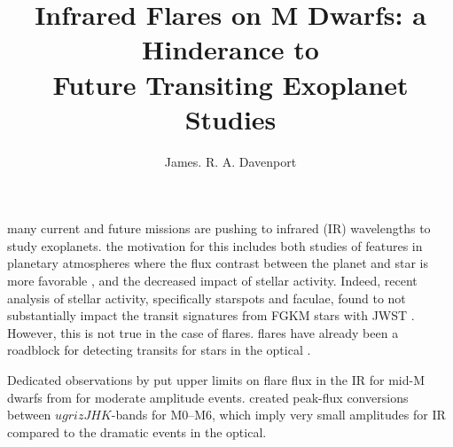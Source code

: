 \documentclass{rnaastex}
\begin{document}
\title{Infrared Flares on M Dwarfs: a Hinderance to\\ Future Transiting Exoplanet Studies}


\author{James. R. A. Davenport}





\section{} 

many current and future missions are pushing to infrared (IR) wavelengths to study exoplanets. the motivation for this includes both studies of features in planetary atmospheres where the flux contrast between the planet and star is more favorable \citep{deming2009}, and the decreased impact of stellar activity. Indeed, recent analysis of stellar activity, specifically starspots and faculae, found to not substantially impact the transit signatures from FGKM stars with JWST \citep{zellem2017}. However, this is not true in the case of flares. flares have already been a roadblock for detecting transits for stars in the optical \citep[e.g. Proxima b][]{davenport2016a, kipping2017}.

Dedicated observations by \citet{tofflemire2012} put upper limits on flare flux in the IR for mid-M dwarfs from for moderate amplitude events.
\citet{davenport2012} created peak-flux conversions between $ugrizJHK$-bands for M0--M6, which imply very small amplitudes for IR compared to the dramatic events in the optical.
\end{document}
